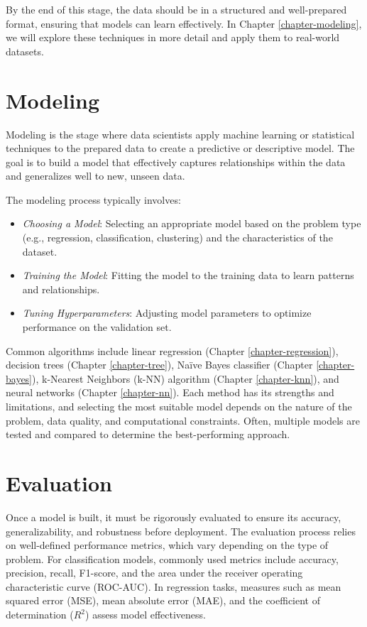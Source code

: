\documentclass[
  11pt,
]{book}
\providecommand{\tightlist}{%
  \setlength{\itemsep}{0pt}\setlength{\parskip}{0pt}}
\theoremstyle{definition}
\theoremstyle{definition}
\theoremstyle{definition}
\theoremstyle{definition}
\theoremstyle{remark}
\begin{document}
By the end of this stage, the data should be in a structured and well-prepared format, ensuring that models can learn effectively. In Chapter \ref{chapter-modeling}, we will explore these techniques in more detail and apply them to real-world datasets.

\section{Modeling}\label{modeling}

Modeling is the stage where data scientists apply machine learning or statistical techniques to the prepared data to create a predictive or descriptive model. The goal is to build a model that effectively captures relationships within the data and generalizes well to new, unseen data.

The modeling process typically involves:

\begin{itemize}
\tightlist
\item
  \emph{Choosing a Model}: Selecting an appropriate model based on the problem type (e.g., regression, classification, clustering) and the characteristics of the dataset.\\
\item
  \emph{Training the Model}: Fitting the model to the training data to learn patterns and relationships.\\
\item
  \emph{Tuning Hyperparameters}: Adjusting model parameters to optimize performance on the validation set.
\end{itemize}

Common algorithms include linear regression (Chapter \ref{chapter-regression}), decision trees (Chapter \ref{chapter-tree}), Naïve Bayes classifier (Chapter \ref{chapter-bayes}), k-Nearest Neighbors (k-NN) algorithm (Chapter \ref{chapter-knn}), and neural networks (Chapter \ref{chapter-nn}). Each method has its strengths and limitations, and selecting the most suitable model depends on the nature of the problem, data quality, and computational constraints. Often, multiple models are tested and compared to determine the best-performing approach.

\section{Evaluation}\label{evaluation}

Once a model is built, it must be rigorously evaluated to ensure its accuracy, generalizability, and robustness before deployment. The evaluation process relies on well-defined performance metrics, which vary depending on the type of problem. For classification models, commonly used metrics include accuracy, precision, recall, F1-score, and the area under the receiver operating characteristic curve (ROC-AUC). In regression tasks, measures such as mean squared error (MSE), mean absolute error (MAE), and the coefficient of determination (\(R^2\)) assess model effectiveness.
\end{document}
